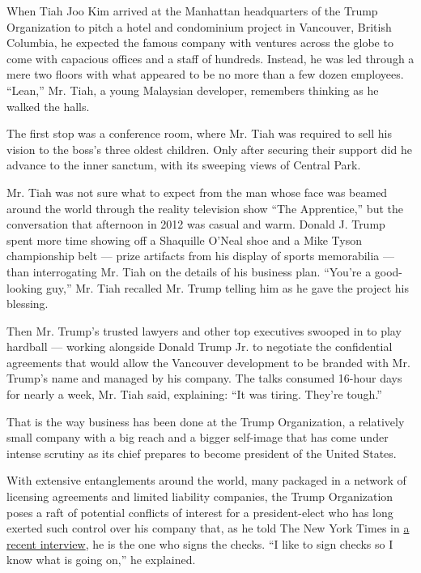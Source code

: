 When Tiah Joo Kim arrived at the Manhattan headquarters of the Trump
Organization to pitch a hotel and condominium project in Vancouver,
British Columbia, he expected the famous company with ventures across
the globe to come with capacious offices and a staff of hundreds.
Instead, he was led through a mere two floors with what appeared to be
no more than a few dozen employees. ``Lean,'' Mr. Tiah, a young
Malaysian developer, remembers thinking as he walked the halls.

The first stop was a conference room, where Mr. Tiah was required to
sell his vision to the boss's three oldest children. Only after securing
their support did he advance to the inner sanctum, with its sweeping
views of Central Park.

Mr. Tiah was not sure what to expect from the man whose face was beamed
around the world through the reality television show ``The Apprentice,''
but the conversation that afternoon in 2012 was casual and warm. Donald
J. Trump spent more time showing off a Shaquille O'Neal shoe and a Mike
Tyson championship belt --- prize artifacts from his display of sports
memorabilia --- than interrogating Mr. Tiah on the details of his
business plan. ``You're a good-looking guy,'' Mr. Tiah recalled Mr.
Trump telling him as he gave the project his blessing.

Then Mr. Trump's trusted lawyers and other top executives swooped in to
play hardball --- working alongside Donald Trump Jr. to negotiate the
confidential agreements that would allow the Vancouver development to be
branded with Mr. Trump's name and managed by his company. The talks
consumed 16-hour days for nearly a week, Mr. Tiah said, explaining: ``It
was tiring. They're tough.''

That is the way business has been done at the Trump Organization, a
relatively small company with a big reach and a bigger self-image that
has come under intense scrutiny as its chief prepares to become
president of the United States.

With extensive entanglements around the world, many packaged in a
network of licensing agreements and limited liability companies, the
Trump Organization poses a raft of potential conflicts of interest for a
president-elect who has long exerted such control over his company that,
as he told The New York Times in
\href{https://www.nytimes.com/2016/11/23/us/politics/trump-new-york-times-interview-transcript.html}{a
recent interview}, he is the one who signs the checks. ``I like to sign
checks so I know what is going on,'' he explained.

